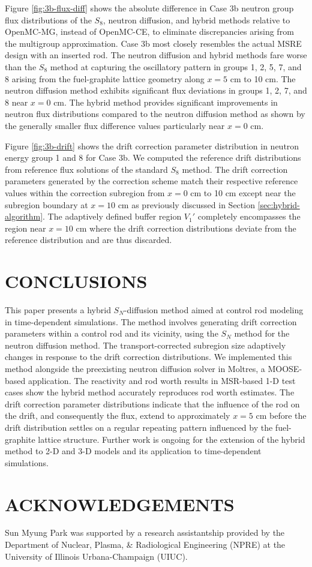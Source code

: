 \documentclass[letterpaper]{mc2025}
\begin{document}
Figure \ref{fig:3b-flux-diff} shows the absolute
difference in Case 3b neutron group flux distributions of the $S_8$, neutron diffusion, and
hybrid methods relative to OpenMC-MG, instead of OpenMC-CE, to eliminate discrepancies arising from
the multigroup approximation. Case 3b most closely resembles the actual \gls*{MSRE} design with an
inserted rod.
The neutron diffusion and hybrid methods fare worse than the $S_8$ method at capturing the
oscillatory pattern in groups 1, 2, 5, 7, and 8 arising from the fuel-graphite lattice geometry
along $x=5$ cm to 10 cm. The neutron diffusion method
exhibits significant flux deviations in groups 1, 2, 7, and 8 near $x=0$ cm. The hybrid method
provides significant improvements in neutron flux distributions compared to the neutron diffusion
method as shown by the generally smaller flux difference values particularly near $x=0$ cm.

Figure \ref{fig:3b-drift} shows the drift correction parameter distribution in neutron energy
group 1 and 8 for Case 3b. We computed the reference drift distributions from reference flux
solutions of the standard $S_8$ method.
The drift correction parameters generated by the correction scheme match their respective reference
values within the correction subregion from $x=0$ cm to 10 cm except near the subregion boundary at
$x=10$ cm as previously discussed in Section \ref{sec:hybrid-algorithm}. The adaptively defined
buffer region $V_1'$ completely encompasses the region near $x=10$ cm where the drift correction
distributions deviate from the reference distribution and are thus discarded.

\section{CONCLUSIONS}

This paper presents a hybrid $S_N$-diffusion method aimed at control rod modeling in time-dependent
simulations. The method involves generating drift correction parameters within a control rod and
its vicinity, using the $S_N$ method for the neutron diffusion method. The transport-corrected
subregion size adaptively changes in response to the drift correction distributions. We implemented
this method alongside the preexisting neutron diffusion solver in Moltres, a \gls*{MOOSE}-based
application. The reactivity and rod worth results in \gls*{MSR}-based 1-D test cases show the hybrid
method accurately reproduces rod worth estimates. The drift correction parameter
distributions indicate that the influence of the rod on the drift, and
consequently the flux, extend to approximately $x=5$ cm before the drift distribution settles on a
regular repeating pattern influenced by the fuel-graphite lattice structure. Further work is
ongoing for the extension of the hybrid method to 2-D and 3-D models and its application to
time-dependent simulations.

\section*{ACKNOWLEDGEMENTS}
Sun Myung Park was supported by a research assistantship provided by the Department of Nuclear,
Plasma, \& Radiological Engineering (NPRE) at the University of Illinois Urbana-Champaign (UIUC).



\end{document}
